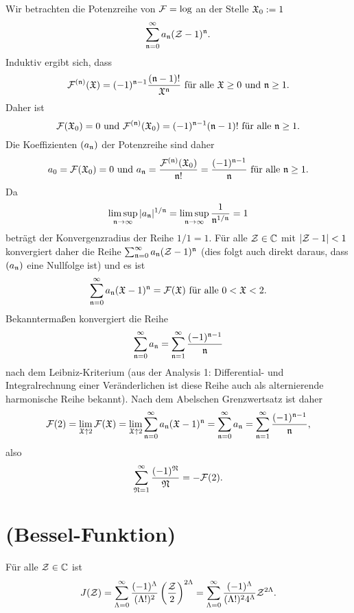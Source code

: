 \documentclass[a4paper,10pt]{article}
\begin{document}
Wir betrachten die Potenzreihe von $\mathcal{F} = \log$ an der Stelle $\mathfrak{X}_0 := 1$
\[
  \sum_{\mathfrak{n}=0}^\infty a_\mathfrak{n} (\mathcal{Z}-1)^\mathfrak{n}.
\]
Induktiv ergibt sich, dass
\[
 \mathcal{F}^{(\mathfrak{n})}(\mathfrak{X}) = (-1)^{\mathfrak{n}-1} \frac{(\mathfrak{n}-1)!}{\mathfrak{X}^\mathfrak{n}} \text{ für alle } \mathfrak{X} \geq 0 \text{ und } \mathfrak{n} \geq 1.
\]
Daher ist
\[
 \mathcal{F}(\mathfrak{X}_0) = 0 \text{ und } \mathcal{F}^{(\mathfrak{n})}(\mathfrak{X}_0) = (-1)^{\mathfrak{n}-1}(\mathfrak{n}-1)! \text{ für alle } \mathfrak{n} \geq 1.
\]
Die Koeffizienten $(a_\mathfrak{n})$ der Potenzreihe sind daher
\[
 a_0 = \mathcal{F}(\mathfrak{X}_0) = 0 \text{ und }
 a_\mathfrak{n} = \frac{\mathcal{F}^{(\mathfrak{n})}(\mathfrak{X}_0)}{\mathfrak{n}!} = \frac{(-1)^{\mathfrak{n}-1}}{\mathfrak{n}} \text{ für alle } \mathfrak{n} \geq 1.
\]
Da
\[
 \limsup_{\mathfrak{n} \to \infty} |a_\mathfrak{n}|^{1/\mathfrak{n}} = \limsup_{\mathfrak{n} \to \infty} \frac{1}{\mathfrak{n}^{1/\mathfrak{n}}} = 1
\]
beträgt der Konvergenzradius der Reihe $1/1 = 1$. Für alle $\mathcal{Z} \in \mathbb{C}$ mit $|\mathcal{Z}-1| < 1$ konvergiert daher die Reihe $\sum_{\mathfrak{n}=0}^\infty a_\mathfrak{n} (\mathcal{Z}-1)^\mathfrak{n}$ (dies folgt auch direkt daraus, dass $(a_\mathfrak{n})$ eine Nullfolge ist) und es ist
\[
 \sum_{\mathfrak{n}=0}^\infty a_\mathfrak{n} (\mathfrak{X}-1)^\mathfrak{n} = \mathcal{F}(\mathfrak{X}) \text{ für alle } 0 < \mathfrak{X} < 2.
\]
Bekanntermaßen konvergiert die Reihe
\[
 \sum_{\mathfrak{n}=0}^\infty a_\mathfrak{n} = \sum_{\mathfrak{n}=1}^\infty \frac{(-1)^{\mathfrak{n}-1}}{\mathfrak{n}}
\]
nach dem Leibniz-Kriterium (aus der Analysis 1: Differential- und Integralrechnung einer Veränderlichen ist diese Reihe auch als alternierende harmonische Reihe bekannt). Nach dem Abelschen Grenzwertsatz ist daher
\[
 \mathcal{F}(2)
 = \lim_{\mathfrak{X} \uparrow 2} \mathcal{F}(\mathfrak{X})
 = \lim_{\mathfrak{X} \uparrow 2} \sum_{\mathfrak{n}=0}^\infty a_\mathfrak{n} (\mathfrak{X}-1)^\mathfrak{n}
 = \sum_{\mathfrak{n}=0}^\infty a_\mathfrak{n}
 = \sum_{\mathfrak{n}=1}^\infty \frac{(-1)^{\mathfrak{n}-1}}{\mathfrak{n}},
\]
also
\[
 \sum_{\mathfrak{N}=1}^\infty \frac{(-1)^\mathfrak{N}}{\mathfrak{N}} = -\mathcal{F}(2).
\]





\section{(Bessel-Funktion)}
Für alle $\mathcal{Z} \in \mathbb{C}$ ist
\[
 J(\mathcal{Z})
 = \sum_{\Lambda=0}^\infty \frac{(-1)^\Lambda}{(\Lambda!)^2} \left( \frac{\mathcal{Z}}{2} \right)^{2\Lambda}
 = \sum_{\Lambda=0}^\infty \frac{(-1)^\Lambda}{(\Lambda!)^2 4^\Lambda} \mathcal{Z}^{2\Lambda}.
\]
\end{document}
